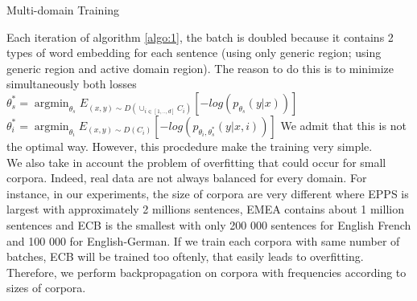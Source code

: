 \documentclass[11pt,a4paper]{article}
\DeclareMathOperator*{\argmin}{argmin}
\begin{document}
\begin{algorithm}[H]
\caption{Multi-domain Training}
\label{algo:1}
\begin{algorithmic}[1]
\REPEAT 
{}
\end{algorithmic}
\end{algorithm}

Each iteration of algorithm \ref{algo:1}, the batch is doubled because it contains 2 types of word embedding for each sentence (using only generic region; using generic region and active domain region). The reason to do this is to minimize simultaneously both losses \\
$\theta^*_{s}=\displaystyle{\mathop{\argmin}_{\theta_s}}E_{(x,y) \sim D(\displaystyle{\mathop{\cup}_{i \in [1,..,d]}}C_{i})}[-log(p_{\theta_s}(y|x))]$ \\ 
$ \theta^*_{i}=\displaystyle{\mathop{\argmin}_{\theta_i}}E_{(x,y) \sim D(C_{i})}[-log(p_{\theta_i,\theta^*_s}(y|x,i))]
$ 
We admit that this is not the optimal way. However, this procdedure make the training very simple.\\
We also take in account the problem of overfitting that could occur for small corpora. Indeed, real data are not always balanced for every domain. For instance, in our experiments, the size of corpora are very different where EPPS is largest with approximately 2 millions sentences, EMEA contains about 1 million sentences and ECB is the smallest with only 200 000 sentences for English French and 100 000 for English-German. If we train each corpora with same number of batches, ECB will be trained too oftenly, that easily leads to overfitting. Therefore, we perform backpropagation on corpora with frequencies according to sizes of corpora.
\end{document}
